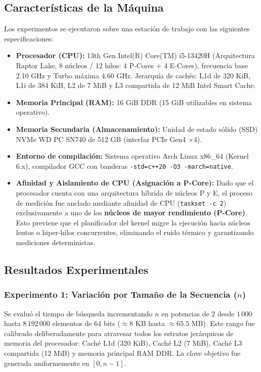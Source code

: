 \documentclass[11pt,letterpaper]{article}
\begin{document}
\subsection{Características de la Máquina}
Los experimentos se ejecutaron sobre una estación de trabajo con las siguientes especificaciones:
\begin{itemize}
    \item \textbf{Procesador (CPU):} 13th Gen Intel(R) Core(TM) i5-13420H (Arquitectura Raptor Lake, 8 núcleos / 12 hilos: 4 P-Cores + 4 E-Cores), frecuencia base 2.10 GHz y Turbo máxima 4.60 GHz. Jerarquía de cachés: L1d de 320 KiB, L1i de 384 KiB, L2 de 7 MiB y L3 compartida de 12 MiB Intel Smart Cache.
    \item \textbf{Memoria Principal (RAM):} 16 GiB DDR (15 GiB utilizables en sistema operativo).
    \item \textbf{Memoria Secundaria (Almacenamiento):} Unidad de estado sólido (SSD) NVMe WD PC SN740 de 512 GB (interfaz PCIe Gen4 $\times$4).
    \item \textbf{Entorno de compilación:} Sistema operativo Arch Linux x86\_64 (Kernel 6.x), compilador GCC con banderas \texttt{-std=c++20 -O3 -march=native}.
    \item \textbf{Afinidad y Aislamiento de CPU (Asignación a P-Core):} 
    Dado que el procesador cuenta con una arquitectura híbrida de núcleos P y E, el proceso de medición fue anclado mediante afinidad de CPU (\texttt{taskset -c 2}) exclusivamente a uno de los \textbf{núcleos de mayor rendimiento (P-Core)}. Esto previene que el planificador del kernel migre la ejecución hacia núcleos lentos o hiper-hilos concurrentes, eliminando el ruido térmico y garantizando mediciones deterministas.
\end{itemize}

\newpage
\subsection{Resultados Experimentales}


\subsubsection{Experimento 1: Variación por Tamaño de la Secuencia ($n$)}

Se evaluó el tiempo de búsqueda incrementando $n$ en potencias de 2 desde $1\,000$ hasta $8\,192\,000$ elementos de 64 bits ($\approx 8\text{ KB}$ hasta $\approx 65.5\text{ MB}$). Este rango fue calibrado deliberadamente para atravesar todos los estratos jerárquicos de memoria del procesador: Caché L1d (320 KiB), Caché L2 (7 MiB), Caché L3 compartida (12 MiB) y memoria principal RAM DDR. La clave objetivo fue generada uniformemente en $[0, n-1]$.
\end{document}
